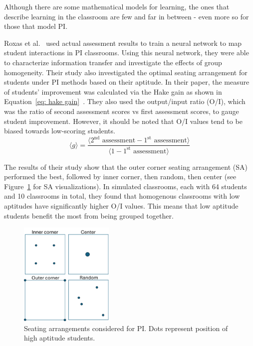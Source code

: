 \documentclass[twocolumn,secnumarabic,amssymb, nobibnotes, aps, prd]{revtex4-2}
\begin{document}
    Although there are some mathematical models for learning, the ones that describe learning in the classroom are few and far in between - even more so for those that model PI.

    Roxas et al.~\cite{roxas2010seating} used actual assessment results to train a neural network to map student interactions in PI classrooms. 
    Using this neural network, they were able to characterize information transfer and investigate the effects of group homogeneity. 
    Their study also investigated the optimal seating arrangement for students under PI methods based on their aptitude.
    In their paper, the measure of students' improvement was calculated via the Hake gain as shown in Equation~\ref{eq: hake gain}~\cite{hake1998}.
    They also used the output/input ratio (O/I), which was the ratio of second assessment scores vs first assessment scores, to gauge student improvement.
    However, it should be noted that O/I values tend to be biased towards low-scoring students.
    \begin{equation}
        \label{eq: hake gain}
        \langle g \rangle = \frac{\langle 2^{\text{nd}}\text{ assessment} - 1^{\text{st}}\text{ assessment} \rangle}{\langle 1 - 1^{\text{st}}\text{ assessment} \rangle}
    \end{equation}

    The results of their study show that the outer corner seating arrangement (SA) performed the best, followed by inner corner, then random, then center (see Figure~\ref{fig:PI SAs} for SA visualizations).
    In simulated classrooms, each with 64 students and 10 classrooms in total, they found that homogenous classrooms with low aptitudes have significantly higher O/I values.
    This means that low aptitude students benefit the most from being grouped together.

    \begin{figure}[htbp!]
        \centering
        \includegraphics[width=0.40\textwidth]{figures/PI SAs.png}
        \caption{Seating arrangements considered for PI. Dots represent position of high aptitude students.}
        \label{fig:PI SAs}
    \end{figure}
\end{document}
